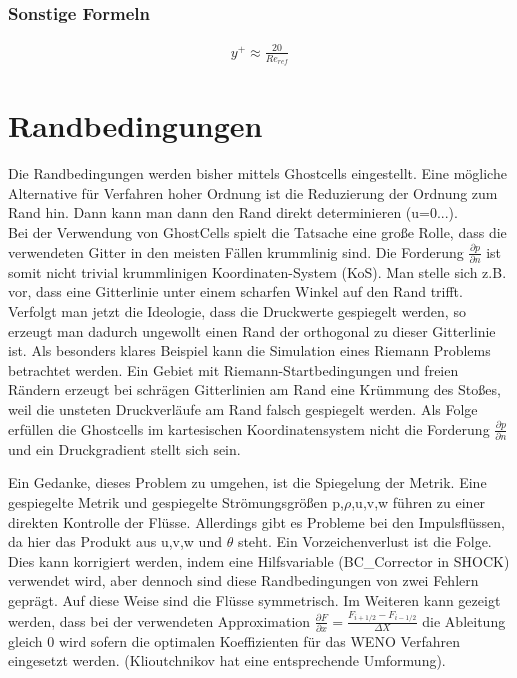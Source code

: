 \subsubsection{Sonstige Formeln}

\begin{align*}
 y^+ \approx \frac{20}{Re_{ref}}
\end{align*}

\section{Randbedingungen}
Die Randbedingungen werden bisher mittels Ghostcells eingestellt. 
Eine mögliche Alternative für Verfahren hoher Ordnung ist die Reduzierung der Ordnung zum Rand hin. 
Dann kann man dann den Rand direkt determinieren (u=0...).\\
Bei der Verwendung von GhostCells spielt die Tatsache eine große Rolle, dass die verwendeten Gitter in den meisten Fällen krummlinig sind.
Die Forderung $\frac{\partial p}{\partial n}$ ist somit nicht trivial krummlinigen Koordinaten-System (KoS).
Man stelle sich z.B. vor, dass eine Gitterlinie unter einem scharfen Winkel auf den Rand trifft.
Verfolgt man jetzt die Ideologie, dass die Druckwerte gespiegelt werden, so erzeugt man dadurch ungewollt einen Rand der orthogonal zu dieser Gitterlinie ist.
Als besonders klares Beispiel kann die Simulation eines Riemann Problems betrachtet werden.
Ein Gebiet mit Riemann-Startbedingungen und freien Rändern erzeugt bei schrägen Gitterlinien am Rand eine Krümmung des Stoßes,
weil die unsteten Druckverläufe am Rand falsch gespiegelt werden.
Als Folge erfüllen die Ghostcells im kartesischen Koordinatensystem nicht die Forderung $\frac{\partial p}{\partial n}$ und ein Druckgradient stellt sich sein.
\par
Ein Gedanke, dieses Problem zu umgehen, ist die Spiegelung der Metrik.
Eine gespiegelte Metrik und gespiegelte Strömungsgrößen p,$\rho$,u,v,w führen zu einer direkten Kontrolle der Flüsse.
Allerdings gibt es Probleme bei den Impulsflüssen, da hier das Produkt aus u,v,w und $\theta$ steht.
Ein Vorzeichenverlust ist die Folge.
Dies kann korrigiert werden, indem eine Hilfsvariable (BC\_Corrector in SHOCK) verwendet wird, aber dennoch sind diese Randbedingungen von zwei Fehlern geprägt.
Auf diese Weise sind die Flüsse symmetrisch. 
Im Weiteren kann gezeigt werden, dass bei der verwendeten Approximation $\frac{\partial F}{\partial x}=\frac{F_{i+1/2}-F_{i-1/2}}{\varDelta X}$ die Ableitung gleich 0 wird sofern die optimalen Koeffizienten für das WENO Verfahren eingesetzt werden. (Klioutchnikov hat eine entsprechende Umformung).
